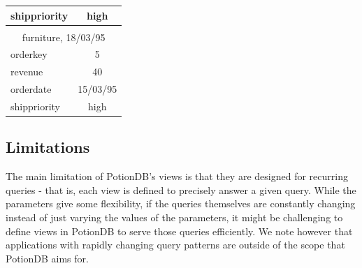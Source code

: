 \documentclass[sigconf, nonacm]{acmart}
\begin{document}
\begin{table}
\begin{minipage}{0.2\textwidth}
\begin{tabular}{lc}
		shippriority & high     \\ \hline
		{} & {} \vspace*{-0.4em}    \\
		\multicolumn{2}{c}{furniture, 18/03/95}                            \\ \hline
		orderkey     & 5        \\
		revenue      & 40       \\
		orderdate    & 15/03/95 \\
		shippriority & high    \\ \hline
	\end{tabular}
\vspace{1em}
\label{table:view_update}
	\end{minipage}
\end{table}

\subsection{Limitations}	%
\label{subsec:limitations}

The main limitation of PotionDB's views is that they are designed for recurring queries - that is, each view is defined to precisely answer a given query.
While the parameters give some flexibility, if the queries themselves are constantly changing instead of just varying the values of the parameters, it might be challenging to define views in PotionDB to serve those queries efficiently.
We note however that applications with rapidly changing query patterns are outside of the scope that PotionDB aims for.
\end{document}
